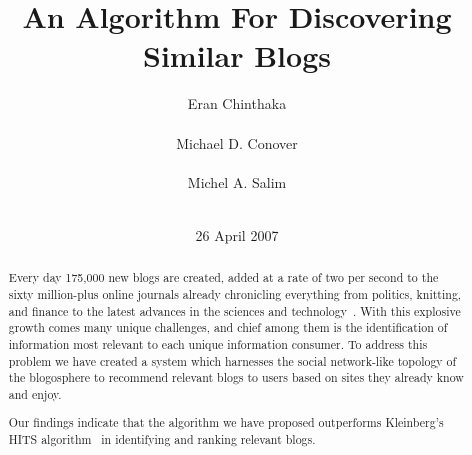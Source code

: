 \documentclass{sig-alternate}
\begin{document}
%

\title{An Algorithm For Discovering Similar Blogs
}
%

\author{
\alignauthor
Eran Chinthaka \\
       \\
\alignauthor
Michael D. Conover \\
       \\
\alignauthor Michel A. Salim \\
       \\
}

\date{26 April 2007}

\maketitle
\begin{abstract}

%
Every day 175,000 new blogs are created, added at a rate of two per
second to the sixty million-plus online journals already chronicling
everything from politics, knitting, and finance to the latest advances
in the sciences and technology~\cite{Disc07}. With this explosive
growth comes many unique challenges, and chief among them is the
identification of information most relevant to each unique information
consumer.  To address this problem we have created a system which
harnesses the social network-like topology of the blogosphere to
recommend relevant blogs to users based on sites they already know and
enjoy.

Our findings indicate that the algorithm we have proposed outperforms
Kleinberg's HITS algorithm~\cite{kleinberg1999ash} in identifying and
ranking relevant blogs.

\end{abstract}
\end{document}

